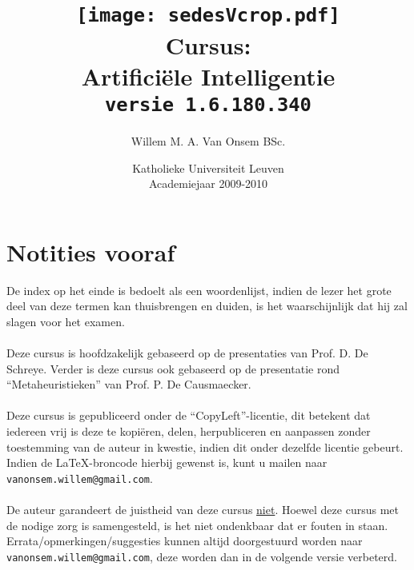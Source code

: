 \documentclass[titlepage,a4paper,openany,]{book}
\title{\texttt{[image: sedesVcrop.pdf]}\\Cursus:\\Artifici\"ele Intelligentie\\\texttt{\small versie 1.6.180.340}}
\author{Willem M. A. Van Onsem BSc.}
\date{Katholieke Universiteit Leuven\\Academiejaar 2009-2010}
\begin{document}
\frontmatter
\begin{titlepage}
\maketitle
\end{titlepage}
\tableofcontents
\newpage
\chapter*{Notities vooraf}
\begin{it}
De index op het einde is bedoelt als een woordenlijst, indien de lezer het grote deel van deze termen kan thuisbrengen en duiden, is het waarschijnlijk dat hij zal slagen voor het examen.
\\\\
Deze cursus is hoofdzakelijk gebaseerd op de presentaties van Prof. D. De Schreye. Verder is deze cursus ook gebaseerd op de presentatie rond ``Metaheuristieken'' van Prof. P. De Causmaecker.
\\\\
Deze cursus is gepubliceerd onder de ``CopyLeft''-licentie, dit betekent dat iedereen vrij is deze te kopi\"eren, delen, herpubliceren en aanpassen zonder toestemming van de auteur in kwestie, indien dit onder dezelfde licentie gebeurt.\\ Indien de \LaTeX-broncode hierbij gewenst is, kunt u mailen naar {\tt vanonsem.willem@gmail.com}.
\\\\
De auteur garandeert de juistheid van deze cursus \underline{niet}. Hoewel deze cursus met de nodige zorg is samengesteld, is het niet ondenkbaar dat er fouten in staan. Errata/opmerkingen/suggesties kunnen altijd doorgestuurd worden naar {\tt vanonsem.willem@gmail.com}, deze worden dan in de volgende versie verbeterd.


\end{it}
\end{document}
